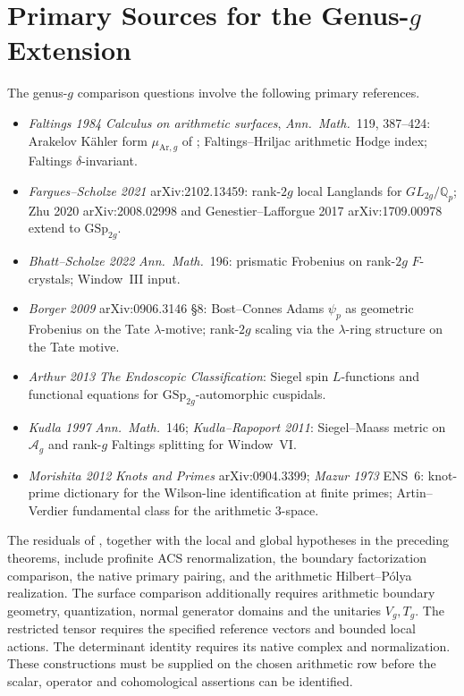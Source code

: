 \section{Primary Sources for the Genus-\(g\) Extension}
\label{v4-arith:w9-r6:sources}

The genus-$g$ comparison questions involve the following primary references.

\begin{itemize}
\item \emph{Faltings 1984} \emph{Calculus on arithmetic surfaces},
\emph{Ann.~Math.}~119, 387--424: Arakelov K\"ahler form
\(\mu_{\mathrm{Ar},g}\) of
; Faltings--Hriljac
arithmetic Hodge index; Faltings \(\delta\)-invariant.
\item \emph{Fargues--Scholze 2021} arXiv:2102.13459: rank-\(2g\) local
Langlands for \(GL_{2g}/\mathbb{Q}_{p}\); Zhu 2020 arXiv:2008.02998
and Genestier--Lafforgue 2017 arXiv:1709.00978 extend to
\(\mathrm{GSp}_{2g}\).
\item \emph{Bhatt--Scholze 2022} \emph{Ann.~Math.}~196: prismatic
Frobenius on rank-\(2g\) \(F\)-crystals;
 Window~III input.
\item \emph{Borger 2009} arXiv:0906.3146 \S8: Bost--Connes Adams
\(\psi_{p}\) as geometric Frobenius on the Tate \(\lambda\)-motive; rank-\(2g\) scaling via the
\(\lambda\)-ring structure on the Tate motive.
\item \emph{Arthur 2013} \emph{The Endoscopic Classification}: Siegel
spin \(L\)-functions and functional equations for
\(\mathrm{GSp}_{2g}\)-automorphic cuspidals.
\item \emph{Kudla 1997} \emph{Ann.~Math.}~146; \emph{Kudla--Rapoport
2011}: Siegel--Maass metric on \(\mathcal{A}_{g}\) and
rank-\(g\) Faltings splitting for Window~VI.
\item \emph{Morishita 2012} \emph{Knots and Primes}
arXiv:0904.3399; \emph{Mazur 1973} ENS~6: knot-prime dictionary for
the Wilson-line identification at finite primes; Artin--Verdier
fundamental class for the arithmetic 3-space.
\end{itemize}

The residuals of , together with the
local and global hypotheses in the preceding theorems, include
profinite ACS renormalization, the boundary factorization comparison,
the native primary pairing, and the arithmetic Hilbert--P\'olya
realization. The surface comparison additionally requires arithmetic
boundary geometry, quantization, normal generator domains and the
unitaries \(V_g,T_g\). The restricted tensor requires the specified
reference vectors and bounded local actions. The determinant identity
requires its native complex and normalization. These constructions
must be supplied on the chosen arithmetic row before the scalar,
operator and cohomological assertions can be identified.

